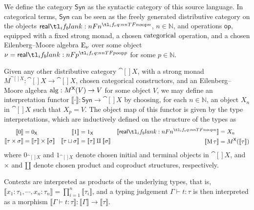 \documentclass[11pt,a4paper]{article}
\theoremstyle{definition}
\theoremstyle{remark}
\providecommand{\N}{\mathbb{N}}
\providecommand{\Syn}{\mathsf{Syn}}
\providecommand{\srcop}{\mathsf{op}}
\providecommand{\genint}[1]{\llbracket #1\rrbracket}
\begin{document}
We define the category \( \Syn \) as the syntactic category of this source language. In categorical terms, \( \Syn \) can be seen as the freely generated distributive category on the objects \( \srcreal[n] \), \( n \in \N \), and operations \( \srcop \), equipped with a fixed strong monad, a chosen \( \opn[b]{categorical} \) operation, and a chosen Eilenberg--Moore algebra \( \opn[b]{E}_{\nu} \) over some object \( \nu = \srcreal[p] \) for some \( p \in \N \).

Given any other distributive category \( \cat[]{X} \), with a strong monad \( M^{\cat[]{X}}: \cat[]{X} \to \cat[]{X} \), chosen categorical constructors, and an Eilenberg--Moore algebra \( \opn{alg}: \Fun[nn]{ M^{\cat[]{X}} }{ V } \to V \) for some object \( V \), we may define an interpretation functor \( \genint{\cdot}: \Syn \to \cat[]{X} \) by choosing, for each \( n \in \N \), an object \( X_{n} \) in \( \cat[]{X} \) such that \( X_{p} = V \). The object map of this functor is given by the type interpretations, which are inductively defined on the structure of the types as
\begin{equation}
  \label{eq:source-language-interpretation-inductive-definition}
  \begin{aligned}
    \genint{0} &= 0_{\cat[]{X}}
    \\
    \genint{\tau \times \sigma} &= \genint{\tau} \times \genint{\sigma}
  \end{aligned}
  \quad
  \begin{aligned}
    \genint{1} &= 1_{\cat[]{X}}
    \\
    \genint{\tau \sqcup \sigma} &= \genint{\tau} \amalg \genint{\sigma}
  \end{aligned}
  \quad
  \begin{aligned}
    \genint{\srcreal[n]} &= X_{n}
    \\
    \genint{\opn[b]{M} \tau} &= \Fun[nn]{ M^{\cat[]{X}} }{ \genint{\tau} }
  \end{aligned}
\end{equation}
where \( 0_{\cat[]{X}} \) and \( 1_{\cat[]{X}} \) denote chosen initial and terminal objects in \( \cat[]{X} \), and \( \times \) and \( \amalg \) denote chosen product and coproduct structures, respectively.

Contexts are interpreted as products of the underlying types, that is, \( \genint{x_{1}: \tau_{1}, \cdots, x_{n} : \tau_{n}} = \prod_{i = 1}^{n} \genint{\tau_{i}} \), and a typing judgement \( \Gamma \vdash t : \tau \) is then interpreted as a morphism \( \genint{\Gamma \vdash t : \tau}: \genint{\Gamma} \to \genint{\tau} \).
\end{document}
